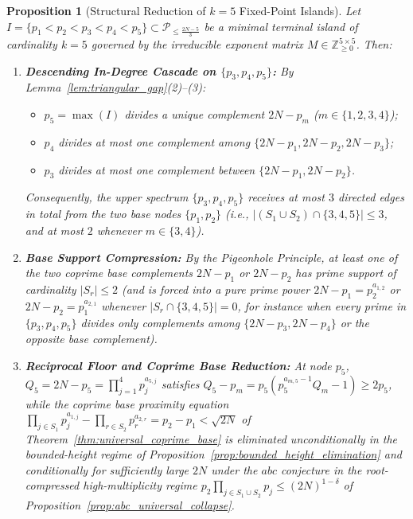 \documentclass[11pt,a4paper]{article}
\newtheorem{proposition}[theorem]{Proposition}
\theoremstyle{definition}
\begin{document}
\begin{proposition}[Structural Reduction of $k=5$ Fixed-Point Islands]
\label{prop:k5_collapse}
Let $I = \{p_1 < p_2 < p_3 < p_4 < p_5\} \subset \mathcal{P}_{\le \frac{2N-5}{3}}$ be a minimal terminal island of cardinality $k = 5$ governed by the irreducible exponent matrix $M \in \mathbb{Z}_{\ge 0}^{5 \times 5}$. Then:
\begin{enumerate}
    \item \textbf{Descending In-Degree Cascade on $\{p_3, p_4, p_5\}$:} By Lemma~\ref{lem:triangular_gap}(2)--(3):
    \begin{itemize}
        \item $p_5 = \max(I)$ divides a unique complement $2N - p_m$ ($m \in \{1, 2, 3, 4\}$);
        \item $p_4$ divides at most one complement among $\{2N - p_1, 2N - p_2, 2N - p_3\}$;
        \item $p_3$ divides at most one complement between $\{2N - p_1, 2N - p_2\}$.
    \end{itemize}
    Consequently, the upper spectrum $\{p_3, p_4, p_5\}$ receives at most $3$ directed edges in total from the two base nodes $\{p_1, p_2\}$ (i.e., $|(S_1 \cup S_2) \cap \{3, 4, 5\}| \le 3$, and at most $2$ whenever $m \in \{3, 4\}$).
    \item \textbf{Base Support Compression:} By the Pigeonhole Principle, at least one of the two coprime base complements $2N - p_1$ or $2N - p_2$ has prime support of cardinality $|S_r| \le 2$ (and is forced into a pure prime power $2N - p_1 = p_2^{a_{1,2}}$ or $2N - p_2 = p_1^{a_{2,1}}$ whenever $|S_r \cap \{3, 4, 5\}| = 0$, for instance when every prime in $\{p_3, p_4, p_5\}$ divides only complements among $\{2N - p_3, 2N - p_4\}$ or the opposite base complement).
    \item \textbf{Reciprocal Floor and Coprime Base Reduction:} At node $p_5$, $Q_5 = 2N - p_5 = \prod_{j=1}^4 p_j^{a_{5,j}}$ satisfies $Q_5 - p_m = p_5(p_5^{a_{m,5}-1} Q_m - 1) \ge 2p_5$, while the coprime base proximity equation $\prod_{j \in S_1} p_j^{a_{1,j}} - \prod_{r \in S_2} p_r^{a_{2,r}} = p_2 - p_1 < \sqrt{2N}$ of Theorem~\ref{thm:universal_coprime_base} is eliminated unconditionally in the bounded-height regime of Proposition~\ref{prop:bounded_height_elimination} and conditionally for sufficiently large $2N$ under the $abc$ conjecture in the root-compressed high-multiplicity regime $p_2 \prod_{j \in S_1 \cup S_2} p_j \le (2N)^{1 - \delta}$ of Proposition~\ref{prop:abc_universal_collapse}.
\end{enumerate}
\end{proposition}
\end{document}
